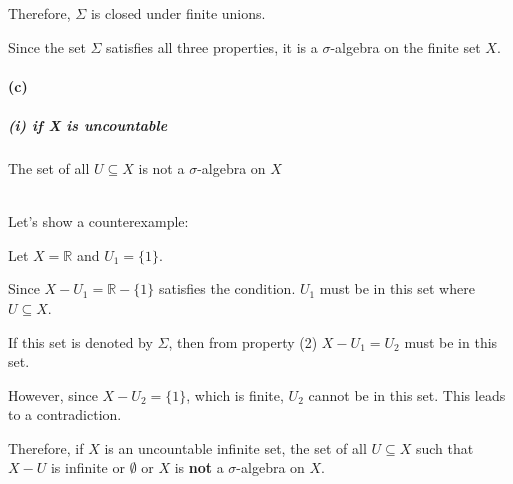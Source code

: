 \documentclass[12pt]{article}
\begin{document}
\par \hspace*{1em}Therefore, $\Sigma$ is closed under finite unions.

\par \hspace*{1em}Since the set $\Sigma$ satisfies all three properties, it is a $\sigma$-algebra on the finite set $X$.


\paragraph{(c)}
\subparagraph{(i) if X is uncountable}
The set of all \( U \subseteq X \) is not a \(\sigma\)-algebra on \(X\) \\ \\
\par \hspace*{1em}Let's show a counterexample: \\
\par \hspace*{1em}Let \( X = \mathbb{R} \) and \( U_1 = \{1\} \). \\
\par \hspace*{1em}Since \( X - U_1 = \mathbb{R} - \{1\} \) satisfies the condition. \( U_1 \) must be in this set where \( U \subseteq X \).\\
\par \hspace*{1em}If this set is denoted by \( \Sigma \), then from property (2) \( X - U_1 = U_2 \) must be in this set.\\

\par \hspace*{1em}However, since \( X - U_2 = \{1\} \), which is finite, \( U_2 \) cannot be in this set. This leads to a contradiction.\\

\par \hspace*{1em}Therefore, if \( X \) is an uncountable infinite set, the set of all \( U \subseteq X \) such that \( X - U \) is infinite or \(\emptyset\) or \(X\) is \textbf{not}  a \( \sigma \)-algebra on \( X \).\\
\end{document}
